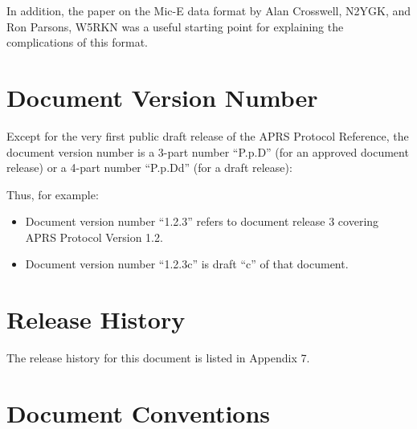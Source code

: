 \documentclass{scrreprt}[letter]
\begin{document}
In addition, the paper on the Mic-E data format by Alan Crosswell, N2YGK,
and Ron Parsons, W5RKN was a useful starting point for explaining the
complications of this format.

\section*{Document Version Number}

Except for the very first public draft release of the APRS Protocol
Reference, the document version number is a 3-part number “P.p.D” (for
an approved document release) or a 4-part number “P.p.Dd” (for a draft
release):




Thus, for example:

\begin{itemize}

\item Document version number “1.2.3” refers to document release 3 covering
APRS Protocol Version 1.2.

\item Document version number “1.2.3c” is draft “c” of that document.

\end{itemize}


\section*{Release History}

The release history for this document is listed in Appendix 7.

\section*{Document Conventions}
\end{document}

